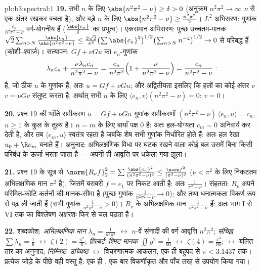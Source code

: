 \begin{solution}{pb:b3:spectral:1}
\textbf{19.} सभी $n$ के लिए $\abs{n^2\pi^2 - \nu} \geq \delta > 0$ (अनुक्रम $n^2\pi^2 \to \infty$ $\nu$ से एक अंतर
रखकर बचता है), और बड़े $n$ के लिए $\abs{n^2\pi^2 - \nu} \geq \frac{n^2\pi^2}2$। $L^2$ अभिसरण: गुणांक $\frac{c_n}{n^2\pi^2 - \nu}$
वर्ग-योगनीय हैं ($\frac{\abs{c_n}}\delta$ का प्रभुत्व)। एकसमान अभिसरण: पुच्छ उच्चतम-मानक
$\sqrt2\sum_{n>N}
\frac{\abs{c_n}}{\abs{n^2\pi^2 - \nu}} \leq
\frac{2\sqrt2}{\pi^2}\bigl(\sum\abs{c_n}^2\bigr)^{1/2}
\bigl(\sum_{n>N}n^{-4}\bigr)^{1/2} \to 0$ से परिबद्ध हैं (कोशी--श्वार्ज़)। सत्यापन: $Gf + \nu Gu$ का $e_n$-गुणांक
\[
\lambda_nc_n + \frac{\nu\lambda_nc_n}{n^2\pi^2 - \nu}
= \frac{c_n}{n^2\pi^2}\Bigl(1 + \frac{\nu}{n^2\pi^2 -
\nu}\Bigr) = \frac{c_n}{n^2\pi^2 - \nu} :
\]
है, जो ठीक $u$ के गुणांक हैं, अतः $u = Gf + \nu Gu$; और अद्वितीयता इसलिए कि
हलों का कोई अंतर $v$ $v = \nu
Gv$ संतुष्ट करता है, अर्थात् सभी $n$ के
लिए $\langle e_n, v\rangle(n^2\pi^2 - \nu) = 0$: $v = 0$।

\textbf{20.} प्रश्न 19 की भाँति समीकरण $u = Gf + \nu
Gu$ गुणांक समीकरणों $(n^2\pi^2 - \nu)\,\langle e_n, u\rangle = c_n$,
$n \geq
1$ के कुल के तुल्य है। $n = m$ के लिए बायाँ पक्ष $0$ है: अतः
हल-योग्यता $c_m = 0$ अनिवार्य कर देती है, और तब $\langle e_m,
u\rangle$ स्वतंत्र रहता है
जबकि शेष सभी गुणांक निर्धारित होते हैं: अतः हल रेखा $u_0 + \R e_m$ बनाते हैं।
अनुनाद: अभिलक्षणिक विधा पर घटक रखने वाला कोई बल उसमें बिना किसी
परिबंध के ऊर्जा भरता जाता है --- अपनी ही आवृत्ति पर धकेला गया झूला।

\textbf{21.} प्रश्न 19 के सूत्र से $\norm{R_\nu f}_2^2
= \sum\frac{\abs{c_n}^2}{(n^2\pi^2 - \nu)^2} \leq
\frac{\norm f^2}{(\pi^2 - \nu)^2}$ ($\nu < \pi^2$ के लिए निकटतम
अभिलक्षणिक मान $\pi^2$ है), जिसमें बराबरी $f = e_1$ पर निकट आती है: अतः
 $\frac1{\pi^2 - \nu}$। संहतता: $R_\nu$ अपने परिमित-कोटि कर्तनों की मानक-सीमा
है (पुच्छ गुणांक $\frac1{n^2\pi^2 - \nu} \to 0$); और  तथा धनात्मकता विकर्ण रूप से
पढ़ ली जाती हैं (सभी गुणांक $\frac1{n^2\pi^2 - \nu} > 0$)। $R_\nu$ के अभिलक्षणिक मान $\frac1{n^2\pi^2 - \nu}$
हैं: अतः भाग I से VI तक का विश्लेषण अक्षरशः फिर से चल पड़ता है।

\textbf{22.} शब्दकोश: \emph{अभिलक्षणिक मान} $\lambda_n =
\frac1{n^2\pi^2}$ $\leftrightarrow$ $n$-वें
संनादी की वर्ग आवृत्ति $n^2\pi^2$; \emph{संचिह्न} $\sum
\lambda_n = \frac16$ $\leftrightarrow$ $\zeta(2) =
\frac{\pi^2}6$;
\emph{हिल्बर्ट--श्मिट मानक} $\iint g^2 =
\frac1{90}$ $\leftrightarrow$ $\zeta(4) = \frac{\pi^4}{90}$; \emph{}
$\leftrightarrow$ बलित तार का अनुनाद; \emph{निम्निष्ठ--उच्चिष्ठ} $\leftrightarrow$ विचरणात्मक
आकलन, एक ही बहुपद से $\pi < 3.1437$ तक। प्रत्येक जोड़े के पीछे वही वस्तु है:
एक ही  , एक बार विकर्णीकृत और पाँच तरह से उपयोग
किया गया।


\end{solution}
